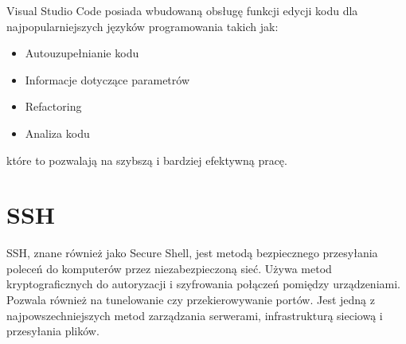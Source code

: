 Visual Studio Code posiada wbudowaną obsługę funkcji edycji kodu dla najpopularniejszych języków programowania takich jak:

\begin{itemize}
	\item Autouzupełnianie kodu
	\item Informacje dotyczące parametrów 
	\item Refactoring
	\item Analiza kodu
\end{itemize}
które to pozwalają na szybszą i bardziej efektywną pracę.

\section{SSH}
SSH, znane również jako Secure Shell, jest metodą bezpiecznego przesyłania poleceń do komputerów przez niezabezpieczoną sieć. Używa metod kryptograficznych do autoryzacji i szyfrowania połączeń pomiędzy urządzeniami. Pozwala również na tunelowanie czy przekierowywanie portów. Jest jedną z najpowszechniejszych metod zarządzania serwerami, infrastrukturą sieciową i przesyłania plików.
